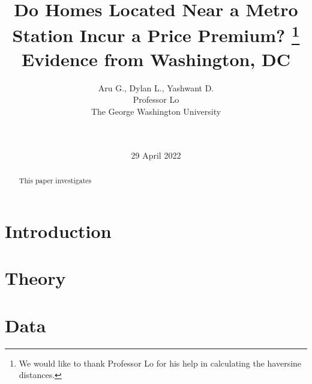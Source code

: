 \documentclass[12pt]{report}
\begin{document}
\title{%
Do Homes Located Near a Metro Station Incur a Price Premium? \thanks{{We would like to thank Professor Lo for his help in calculating the haversine distances.}} \\ 
\Large
Evidence from Washington, DC}
\author{Aru G., Dylan L., Yashwant D. \\ Professor Lo\\The George Washington University\\  \\  \\ }
\date{29 April 2022}

\maketitle





\begin{abstract}
\smallskip
This paper investigates 

\end{abstract}

\section*{Introduction}

\section*{Theory}


\section*{Data}
\end{document}
